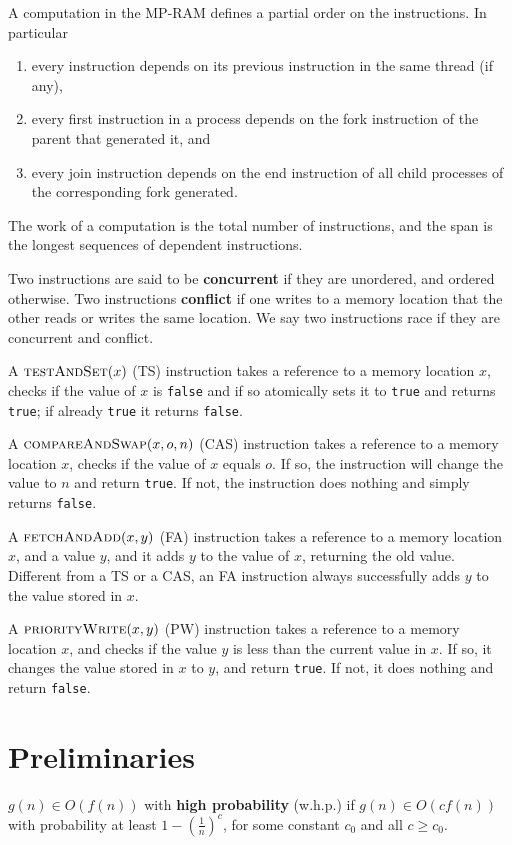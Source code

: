 \documentclass[11pt]{article}
\begin{document}
A computation in the MP-RAM defines a partial order on the instructions. In particular
\begin{enumerate}
\item every instruction depends on its previous instruction in the same thread (if any),
\item every first instruction in a process depends on the fork instruction of the parent that generated
it, and
\item every join instruction depends on the end instruction of all child processes of the corresponding
fork generated.
\end{enumerate}

The work of a computation is the total number of instructions, and the span is the longest sequences
of dependent instructions.

Two instructions are said to be \textbf{concurrent} if they are unordered, and ordered otherwise. Two
instructions \textbf{conflict} if one writes to a memory location that the other reads or writes the same
location. We say two instructions race if they are concurrent and conflict.

A \(\textsc{testAndSet}(x)\) (TS) instruction takes a reference to a memory location \(x\), checks if
the value of \(x\) is \texttt{false} and if so atomically sets it to \texttt{true} and returns \texttt{true}; if already \texttt{true} it
returns \texttt{false}.

A \(\textsc{compareAndSwap}(x, o, n)\) (CAS) instruction takes a reference to a memory location \(x\),
checks if the value of \(x\) equals \(o\). If so, the instruction will change the value to \(n\) and
return \texttt{true}. If not, the instruction does nothing and simply returns \texttt{false}.

A \(\textsc{fetchAndAdd}(x, y)\) (FA) instruction takes a reference to a memory location \(x\), and a
value \(y\), and it adds \(y\) to the value of \(x\), returning the old value. Different from a TS or
a CAS, an FA instruction always successfully adds \(y\) to the value stored in \(x\).

A \(\textsc{priorityWrite}(x, y)\) (PW) instruction takes a reference to a memory location \(x\), and
checks if the value \(y\) is less than the current value in \(x\). If so, it changes the value stored
in \(x\) to \(y\), and return \texttt{true}. If not, it does nothing and return \texttt{false}.
\section{Preliminaries}
\label{sec:orga019097}
\begin{definition}[w.h.p.]
\(g(n)\in O(f(n))\) with \textbf{high probability} (w.h.p.) if \(g(n)\in O(cf(n))\) with probability at least
\(1-(\frac{1}{n})^c\), for some constant \(c_0\) and all \(c\ge c_0\).
\end{definition}
\end{document}

